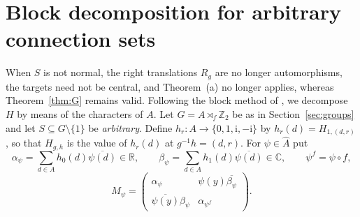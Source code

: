 \documentclass[preprint,11pt]{elsarticle}
\makeatletter
\theoremstyle{definition}
\theoremstyle{remark}
\newcommand{\Z}{\mathbb Z}
\newcommand{\ii}{\mathrm i}
\newcommand{\SR}[1]{\@nameuse{SR@#1}}
\makeatother
\begin{document}
\section{Block decomposition for arbitrary connection sets}\label{sec:block}

When $S$ is not normal, the right translations $R_g$ are no longer automorphisms, the targets need not be central, and Theorem~\SR{thm:C}(a) no longer applies, whereas Theorem~\ref{thm:G} remains valid. Following the block method of \cite{Arezoomand,BehajainaLegrand}, we decompose $H$ by means of the characters of $A$. Let $G=A\rtimes_f\Z_2$ be as in Section~\ref{sec:groups} and let $S\subseteq G\setminus\{1\}$ be \emph{arbitrary}. Define $h_r:A\to\{0,1,\ii,-\ii\}$ by $h_r(d)=H_{1,(d,r)}$, so that $H_{g,h}$ is the value of $h_r(d)$ at $g^{-1}h=(d,r)$. For $\psi\in\widehat A$ put
\[
\alpha_\psi=\sum_{d\in A}h_0(d)\overline{\psi(d)}\in\mathbb R,\qquad \beta_\psi=\sum_{d\in A}h_1(d)\overline{\psi(d)}\in\mathbb C,\qquad \psi^f=\psi\circ f,
\]
\[
M_\psi=\begin{pmatrix}\alpha_\psi&\psi(y)\overline{\beta_\psi}\\ \overline{\psi(y)}\beta_\psi&\alpha_{\psi^f}\end{pmatrix}.
\]
\end{document}
